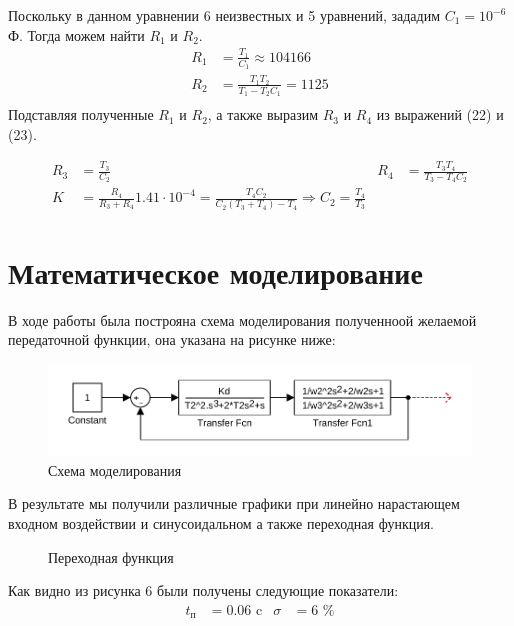 \documentclass[russian, utf8]{eskdtext}
\begin{document}
Поскольку в данном уравнении 6 неизвестных и 5 уравнений, зададим $C_1 = 10^{-6}$ Ф. Тогда можем найти $R_1$ и $R_2$.
\begin{align*}
    R_1 & = \frac{T_1}{C_1} \approx 104166 \\
    R_2 & = \frac{T_1T_2}{T_1 - T_2C_1} = 1125 \\
\end{align*}
Подставляя полученные $R_1$ и $R_2$, а также выразим $R_3$ и $R_4$ из выражений (22) и (23).

\begin{align*}
    R_3 & = \frac{T_3}{C_2} & R_4 & = \frac{T_3 T_4}{T_3 - T_4C_2} \\
    K & = \frac{R_4}{R_3 + R_4}1.41\cdot 10^{-4} = \frac{T_4 C_2}{C_2(T_3 + T_4) - T_4} \Rightarrow C_2 = \frac{T_4}{T_3}
\end{align*}
\section{Математическое моделирование}

В ходе работы была построяна схема моделирования полученноой желаемой передаточной функции, она указана на рисунке ниже: 
\begin{figure}[h!]
    \centering
    \includegraphics {images/model.pdf} 
    \caption{Схема моделирования}
\end{figure} \par

В результате мы получили различные графики при линейно нарастающем входном воздействии и синусоидальном а также переходная функция.
\begin{figure}[h!]
    \centering
    \caption{Переходная функция}
\end{figure} \par
Как видно из рисунка 6 были получены следующие показатели:
\begin{align*}
    t_\text{п} & = 0.06\text{ c} & \sigma & = 6\text{ \%}
\end{align*} \par
\end{document}
